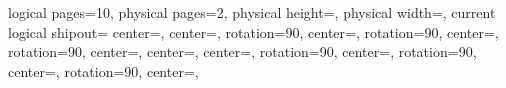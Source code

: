 {%
  \edef\pgfpageoptionheight{\the\paperwidth}
  \edef\pgfpageoptionwidth{\the\paperheight}
  \def\pgfpageoptionborder{0pt}
  \def\pgfpageoptionfirstshipout{1}
  \def\pgfpageoptionbordercode{\pgfusepath{draw}}
}%
{%
  \pgfpagesphysicalpageoptions
  {%
    logical pages=10,%
    physical pages=2,%
    physical height=\pgfpageoptionheight,%
    physical width=\pgfpageoptionwidth,%
    current logical shipout=\pgfpageoptionfirstshipout%
  }
    {%
      center=,%
    }%
    {%
      center=,%
    }%
    {%
      rotation=90,%
      center=,%
    }%
    {%
      rotation=90,%
      center=,%
    }%
    {%
      rotation=90,%
      center=,%
    }%
    {%
      center=\pgfpoint{\pgfphysicalwidth - .5\paperwidth}{.75\pgfphysicalheight},%
    }%
    {%
      center=\pgfpoint{\pgfphysicalwidth - .5\paperwidth}{.25\pgfphysicalheight},%
    }%
    {%
      rotation=90,%
      center=,%
    }%
    {%
      rotation=90,%
      center=,%
    }%
    {%
      rotation=90,%
      center=,%
    }%
}


